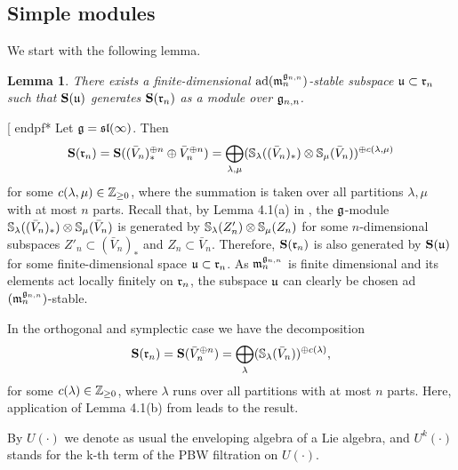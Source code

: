 \documentclass[12pt]{amsart}
\makeatletter
\def\mathbb{\Bbb}
\def\mathfrak{\frak}
\newenvironment{proof}{%
         \@ifnextchar[{%
                       \expandafter\let\expandafter\end@proof
                         \csname endpf*\endcsname
                         \my@proof
                      }{\let\end@proof\endpf\pf}%
        }{\end@proof}
\def\my@proof[#1]{\@nameuse{pf*}{#1}}
\def\@putname#1#2#3#4{\def\@@ref{#3}\let\old@bf\bf
        \def\bf##1{\old@bf\if?\noexpand##1?{#4}\else##1\fi}%
        #1{#2}%
        \let\bf\old@bf}
\def\@putname#1#2#3#4{\def\@@ref{#3}\let\old@bf\bf    %
        \let\old@reset@font\reset@font                  %
        \def\bf##1{\old@bf\if?\noexpand##1?{#4}\else##1\fi}%
        \def\reset@font##1##2{\old@reset@font##1\if?\noexpand##2?{#4}\else##2\fi}#1{#2}%
        \let\bf\old@bf\let\reset@font\old@reset@font}
\let\my@cite=\cite
\def\cite#1{\@putname\my@cite{#1}{\@citeb}{\tiny\rm\@@ref}}
\theoremstyle{plain} %
\numberwithin{equation}{section}
\theoremstyle{definition}
\theoremstyle{remark}
\theoremstyle{plain} %
\newtheorem{lemma}[definition]{Lemma}
\newcommand{\fg}{\mathfrak{g}}
\newcommand{\fr}{\mathfrak{r}}
\newcommand{\fu}{\mathfrak{u}}
\newcommand{\fm}{\mathfrak{m}}
\makeatother
\begin{document}
\subsection{Simple modules}\label{Simple modules} We start with the following lemma.
\begin{lemma} \label{fg} There exists a finite-dimensional $\operatorname{ad}(\fm_n^{\fg_{n,n}})$-stable subspace
 $\mathfrak u\subset\mathfrak r_{n}$ such that ${\bf S}(\mathfrak u)$ generates
${\bf S}(\fr_{n})$ as a module over $\mathfrak g_{n,n}$. 
\end{lemma} 
\begin{proof} Let $\fg=\mathfrak{sl}(\infty)$. Then
$${\bf S}(\fr_{n})= {\bf S}((\bar{V}_n)_*^{\oplus n}\oplus \bar{V}_n^{\oplus n})=\bigoplus_{\lambda, \mu} (\mathbb{S}_\lambda((\bar{V}_n)_*)\otimes \mathbb{S}_{\mu}(\bar{V}_n))^{\oplus c(\lambda,\mu)}$$
for some $c(\lambda,\mu)\in\mathbb{Z}_{\geq 0}$, where the summation is taken over all partitions $\lambda,\mu$ with at most $n$ parts. Recall that, by Lemma 4.1(a) in \cite{DPS}, the $\fg$-module $\mathbb S_\lambda((\bar{V}_n)_*)\otimes \mathbb S_\mu(\bar{V}_n)$ is generated by $\mathbb S_\lambda(Z'_n)\otimes \mathbb S_\mu(Z_n)$ for some $n$-dimensional subspaces $Z'_n \subset (\bar{V}_n)_*$ and $Z_n \subset \bar{V}_n$.
Therefore, ${\bf S}(\mathfrak r_n)$ is also generated by ${\bf S}(\mathfrak{u})$ for some finite-dimensional space $\mathfrak{u}\subset \fr_n$. As $\fm_n^{\fg_{n,n}}$ is finite dimensional and its elements act locally finitely on $\fr_n$, the subspace $\fu$ can clearly be chosen ad$(\fm_n^{\fg_{n,n}})$-stable.




In the orthogonal and symplectic case we have the decomposition
$${\bf S}(\fr_{n})= {\bf S}(\bar{V}_n^{\oplus n})=\bigoplus_{\lambda} (\mathbb S_\lambda(\bar{V}_n))^{\oplus c(\lambda)},$$
for some $c(\lambda)\in\mathbb{Z}_{\geq 0}$, where $\lambda$ runs over all partitions with at most $n$ parts. Here, application of Lemma 4.1(b) from \cite{DPS} leads to the result.
\end{proof}

By $U(\cdot)$ we denote as usual the enveloping algebra of a Lie algebra, and $U^k(\cdot)$ stands for the k-th term of the PBW filtration on $U(\cdot)$.
\end{document}
